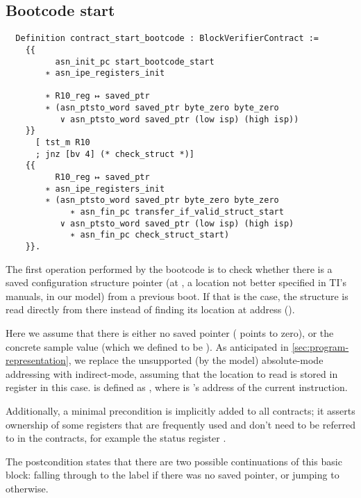 \subsection{Bootcode start}

\begin{verbatim}
  Definition contract_start_bootcode : BlockVerifierContract :=
    {{
          asn_init_pc start_bootcode_start
        ∗ asn_ipe_registers_init

        ∗ R10_reg ↦ saved_ptr
        ∗ (asn_ptsto_word saved_ptr byte_zero byte_zero
           ∨ asn_ptsto_word saved_ptr (low isp) (high isp))
    }}
      [ tst_m R10
      ; jnz [bv 4] (* check_struct *)]
    {{
          R10_reg ↦ saved_ptr
        ∗ asn_ipe_registers_init
        ∗ (asn_ptsto_word saved_ptr byte_zero byte_zero
             ∗ asn_fin_pc transfer_if_valid_struct_start
           ∨ asn_ptsto_word saved_ptr (low isp) (high isp)
             ∗ asn_fin_pc check_struct_start)
    }}.
\end{verbatim}

The first operation performed by the bootcode is to check whether there is a saved configuration structure pointer (at , a location not better specified in TI's manuals,  in our model) from a previous boot. If that is the case, the structure is read directly from there instead of finding its location at address  ().

Here we assume that there is either no saved pointer ( points to zero), or the concrete sample value  (which we defined to be ). As anticipated in \cref{sec:program-representation}, we replace the unsupported (by the model) absolute-mode addressing with indirect-mode, assuming that the location to read is stored in register  in this case.  is defined as , where  is 's address of the current instruction.

Additionally, a minimal precondition is implicitly added to all contracts; it asserts ownership of some registers that are frequently used and don't need to be referred to in the contracts, for example the status register .

The postcondition states that there are two possible continuations of this basic block: falling through to the  label if there was no  saved pointer, or jumping to  otherwise.

